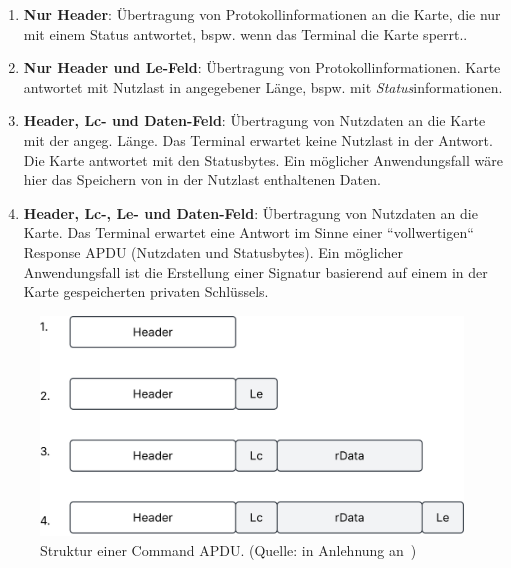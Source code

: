 \begin{enumerate}
    \itemsep0.5em
    \item \textbf{Nur Header}: Übertragung von Protokollinformationen an die Karte, die nur mit einem Status antwortet, bspw. wenn das Terminal die Karte sperrt..
    \item \textbf{Nur Header und Le-Feld}: Übertragung von Protokollinformationen.
    Karte antwortet mit Nutzlast in angegebener Länge, bspw. mit \textit{Status}informationen.
    \item \textbf{Header, Lc- und Daten-Feld}: Übertragung von Nutzdaten an die Karte mit der angeg. Länge. Das Terminal erwartet keine Nutzlast in der Antwort. Die Karte antwortet mit den Statusbytes. Ein möglicher Anwendungsfall wäre hier das Speichern von in der Nutzlast enthaltenen Daten.
    \item \textbf{Header, Lc-, Le- und Daten-Feld}: Übertragung von Nutzdaten an die Karte. Das Terminal erwartet eine Antwort im Sinne einer ``vollwertigen`` Response APDU (Nutzdaten und Statusbytes). Ein möglicher Anwendungsfall ist die Erstellung einer Signatur basierend auf einem in der Karte gespeicherten privaten Schlüssels.
\end{enumerate}



\begin{figure}
    \centering
    \includegraphics[scale=0.4]{aufgabe 1/img/cases.svg}
    \caption{Struktur einer Command APDU. (Quelle: in Anlehnung an~\cite[\textbf{Bild 6.41}, 431]{RF02})}
    \label{fig:cases}
\end{figure}
